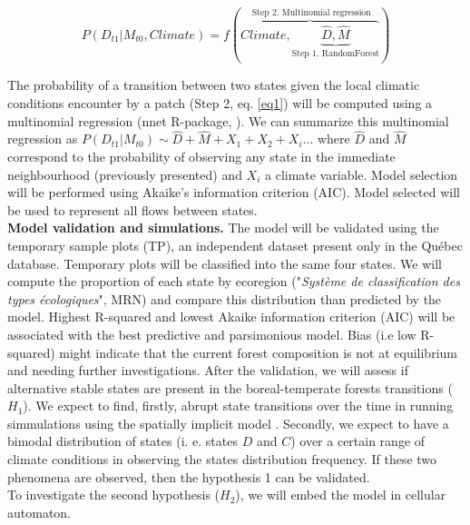 \begin{equation}
	P(D_{t1}|M_{t0}, Climate) = f(\overbrace{Climate, \underbrace{\hat{D}, \hat{M}}_\text{Step 1. RandomForest}}^\text{ Step 2. Multinomial regression})
\label{eq1}
\end{equation}

The probability of a transition between two states given the local climatic
conditions encounter by a patch (Step 2, eq. \ref{eq1}) will be computed using a multinomial
regression (nnet R-package, \cite{Venables2002}). We can summarize this
multinomial regression as $P(D_{t1}|M_{t0}) \sim \hat{D} + \hat{M} +
X_1+X_2+X_i... $ where $\hat{D}$ and $\hat{M}$ correspond to the probability
of observing any state in the immediate neighbourhood (previously presented)
and $X_i$ a climate variable. Model selection will be performed using Akaike's
information criterion (AIC). Model selected will be used to represent all
flows between states.   \\

\textbf{Model validation and simulations.}  The model will be validated using the temporary
sample plots (TP), an independent dataset present only in the Québec database.
Temporary plots will be classified into the same four states. We will compute
the proportion of each state by ecoregion ("\textit{Système de classification
des types écologiques}", MRN) and compare this distribution than predicted by
the model.  Highest R-squared and lowest Akaike information criterion (AIC)
will be associated with the best predictive and parsimonious model. Bias (i.e
low R-squared) might indicate that the current forest composition is not at
equilibrium and needing further investigations. After the validation, we will
assess if alternative stable states are present in the boreal-temperate
forests transitions ($H_1$).  We expect to find, firstly, abrupt state
transitions over the time in running simmulations using the spatially implicit
model . Secondly, we expect to have a bimodal distribution of states (i. e. states
$D$ and $C$) over a certain range of climate conditions in observing the states
distribution frequency. If these two phenomena are observed, then the
hypothesis 1 can be validated. \\


To investigate the second hypothesis ($H_2$), we will embed the model in cellular
automaton. 

